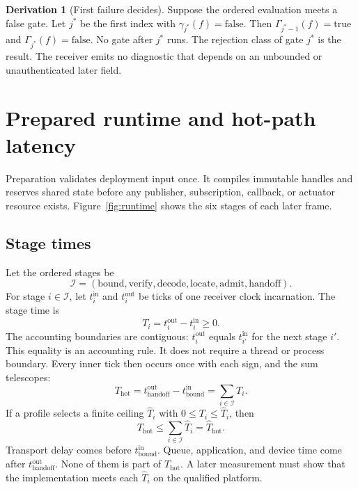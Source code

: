 \documentclass[11pt,a4paper]{article}
\theoremstyle{definition}
\newtheorem{derivation}{Derivation}[section]
\begin{document}
\begin{derivation}[First failure decides]
Suppose the ordered evaluation meets a false gate. Let $j^\ast$ be the first index with
$\gamma_{j^\ast}(f)=\mathrm{false}$. Then $\Gamma_{j^\ast-1}(f)=\mathrm{true}$ and
$\Gamma_{j^\ast}(f)=\mathrm{false}$. No gate after $j^\ast$ runs. The rejection class
of gate $j^\ast$ is the result. The receiver emits no diagnostic that depends on an
unbounded or unauthenticated later field.
\end{derivation}

\section{Prepared runtime and hot-path latency}


Preparation validates deployment input once. It compiles immutable handles and
reserves shared state before any publisher, subscription, callback, or actuator
resource exists. Figure~\ref{fig:runtime} shows the six stages of each later frame.


\subsection{Stage times}

Let the ordered stages be
\begin{equation}\label{eq:stages}
\mathcal{I}=(\mathrm{bound},\mathrm{verify},\mathrm{decode},\mathrm{locate},
\mathrm{admit},\mathrm{handoff}).
\end{equation}
For stage $i\in\mathcal{I}$, let $t_i^{\mathrm{in}}$ and $t_i^{\mathrm{out}}$ be ticks
of one receiver clock incarnation. The stage time is
\begin{equation}\label{eq:stage-time}
T_i=t_i^{\mathrm{out}}-t_i^{\mathrm{in}}\geq0.
\end{equation}
The accounting boundaries are contiguous: $t_i^{\mathrm{out}}$ equals
$t_{i'}^{\mathrm{in}}$ for the next stage $i'$. This equality is an accounting rule. It
does not require a thread or process boundary. Every inner tick then occurs once with
each sign, and the sum telescopes:
\begin{equation}\label{eq:hot-time}
T_{\mathrm{hot}}=t_{\mathrm{handoff}}^{\mathrm{out}}-t_{\mathrm{bound}}^{\mathrm{in}}
=\sum_{i\in\mathcal{I}}T_i.
\end{equation}
If a profile selects a finite ceiling $\hat T_i$ with $0\leq T_i\leq\hat T_i$, then
\begin{equation}\label{eq:hot-bound}
T_{\mathrm{hot}}\leq\sum_{i\in\mathcal{I}}\hat T_i=\hat T_{\mathrm{hot}}.
\end{equation}
Transport delay comes before $t_{\mathrm{bound}}^{\mathrm{in}}$. Queue, application, and
device time come after $t_{\mathrm{handoff}}^{\mathrm{out}}$. None of them is part of
$T_{\mathrm{hot}}$. A later measurement must show that the implementation meets each
$\hat T_i$ on the qualified platform.
\end{document}
